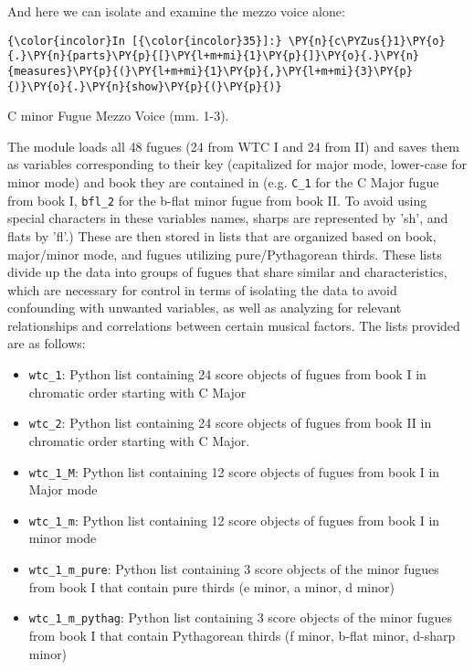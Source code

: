     And here we can isolate and examine the mezzo voice alone:


    \begin{Verbatim}[commandchars=\\\{\}]
{\color{incolor}In [{\color{incolor}35}]:} \PY{n}{c\PYZus{}1}\PY{o}{.}\PY{n}{parts}\PY{p}{[}\PY{l+m+mi}{1}\PY{p}{]}\PY{o}{.}\PY{n}{measures}\PY{p}{(}\PY{l+m+mi}{1}\PY{p}{,}\PY{l+m+mi}{3}\PY{p}{)}\PY{o}{.}\PY{n}{show}\PY{p}{(}\PY{p}{)}
\end{Verbatim}

\begin{Example}[H]
    \begin{center}
    \caption{ C minor Fugue Mezzo Voice (mm. 1-3). }
    \end{center}
\end{Example}
    
    The module loads all 48 fugues (24 from WTC I and 24 from II) and saves
them as variables corresponding to their key (capitalized for major
mode, lower-case for minor mode) and book they are contained in (e.g.
\texttt{C\_1} for the C Major fugue from book I, \texttt{bfl\_2} for the
b-flat minor fugue from book II. To avoid using special characters in
these variables names, sharps are represented by 'sh', and flats by
'fl'.) These are then stored in lists that are organized based on book,
major/minor mode, and fugues utilizing pure/Pythagorean thirds. These
lists divide up the data into groups of fugues that share similar and
characteristics, which are necessary for control in terms of isolating
the data to avoid confounding with unwanted variables, as well as
analyzing for relevant relationships and correlations between certain
musical factors. The lists provided are as follows:

\begin{itemize}
\tightlist
\item
  \texttt{wtc\_1}: Python list containing 24 score objects of fugues
  from book I in chromatic order starting with C Major
\item
  \texttt{wtc\_2}: Python list containing 24 score objects of fugues
  from book II in chromatic order starting with C Major.
\item
  \texttt{wtc\_1\_M}: Python list containing 12 score objects of fugues
  from book I in Major mode
\item
  \texttt{wtc\_1\_m}: Python list containing 12 score objects of fugues
  from book I in minor mode
\item
  \texttt{wtc\_1\_m\_pure}: Python list containing 3 score objects of
  the minor fugues from book I that contain pure thirds (e minor, a
  minor, d minor)
\item
  \texttt{wtc\_1\_m\_pythag}: Python list containing 3 score objects of
  the minor fugues from book I that contain Pythagorean thirds (f minor,
  b-flat minor, d-sharp minor)
\end{itemize}

